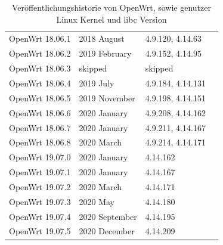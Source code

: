 \documentclass[a4paper]{book}
\begin{document}
\begin{large}
\begin{appendix}
\begin{table}[ht]
\begin{tabular}{llll}
OpenWrt 18.06.1 & 2018 August & 4.9.120, 4.14.63 &  \\ \cline{1-3}
OpenWrt 18.06.2 & 2019 February & 4.9.152, 4.14.95 &  \\ \cline{1-3}
OpenWrt 18.06.3 & skipped & skipped &  \\ \cline{1-3}
OpenWrt 18.06.4 & 2019 July & 4.9.184, 4.14.131 &  \\ \cline{1-3}
OpenWrt 18.06.5 & 2019 November & 4.9.198, 4.14.151 &  \\ \cline{1-3}
OpenWrt 18.06.6 & 2020 January & 4.9.208, 4.14.162 &  \\ \cline{1-3}
OpenWrt 18.06.7 & 2020 January & 4.9.211, 4.14.167 &  \\ \cline{1-3}
OpenWrt 18.06.8 & 2020 March & 4.9.214, 4.14.171 &  \\ \cline{1-3}
OpenWrt 19.07.0 & 2020 January & 4.14.162 &  \\ \cline{1-3}
OpenWrt 19.07.1 & 2020 January & 4.14.167 &  \\ \cline{1-3}
OpenWrt 19.07.2 & 2020 March & 4.14.171 &  \\ \cline{1-3}
OpenWrt 19.07.3 & 2020 May & 4.14.180 &  \\ \cline{1-3}
OpenWrt 19.07.4 & 2020 September & 4.14.195 &  \\ \cline{1-3}
OpenWrt 19.07.5 & 2020 December & 4.14.209 & \\ \hline
\end{tabular}
\caption{Veröffentlichungshistorie von OpenWrt, sowie genutzer Linux Kernel und libc Version}
\label{tab:OpenWrt_History}
\end{table}

\end{appendix}

\end{large}
\end{document}
